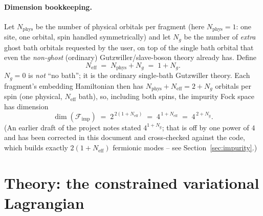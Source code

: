 \documentclass[11pt]{article}
\newcommand{\Neff}{N_{\mathrm{eff}}}
\newcommand{\Nphys}{N_{\mathrm{phys}}}
\newcommand{\Ng}{N_{g}}
\begin{document}
\paragraph{Dimension bookkeeping.} Let $\Nphys$ be the number of physical
orbitals per fragment (here $\Nphys=1$: one site, one orbital, spin handled
symmetrically) and let $\Ng$ be the number of \emph{extra} ghost bath orbitals
requested by the user, on top of the single bath orbital that even the
\emph{non-ghost} (ordinary) Gutzwiller/slave-boson theory already has. Define
\begin{equation}
  \Neff \;=\; \Nphys + \Ng \;=\; 1 + \Ng .
\end{equation}
$\Ng=0$ is \emph{not} ``no bath''; it is the ordinary single-bath Gutzwiller
theory. Each fragment's embedding Hamiltonian then has $\Nphys+\Neff = 2+\Ng$
orbitals per spin (one physical, $\Neff$ bath), so, including both spins, the
impurity Fock space has dimension
\begin{equation}
  \dim(\mathcal F_{\mathrm{imp}}) \;=\; 2^{\,2(1+\Neff)} \;=\; 4^{\,1+\Neff}
  \;=\; 4^{\,2+\Ng}.
  \label{eq:fockdim}
\end{equation}
(An earlier draft of the project notes stated $4^{1+\Ng}$; that is off by one power
of $4$ and has been corrected in this document and cross-checked against the
code, which builds exactly $2(1+\Neff)$ fermionic modes -- see
Section~\ref{sec:impurity}.)

\section{Theory: the constrained variational Lagrangian}
\label{sec:lagrangian}
\end{document}
